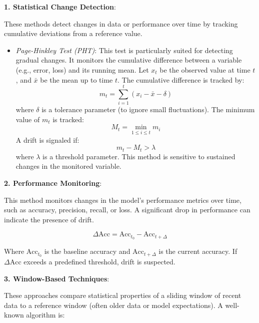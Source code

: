 \textbf{1. Statistical Change Detection}:

These methods detect changes in data or performance over time by tracking
cumulative deviations from a reference value.

\begin{itemize}
    \item \textit{Page-Hinkley Test (PHT)}: This test is particularly suited for
          detecting gradual changes. It monitors the cumulative difference between a variable
          (e.g., error, loss) and its running mean. Let $ x_t $ be the observed value at time
          $ t $, and $ \bar{x} $ be the mean up to time $ t $. The cumulative difference
          is tracked by:
          \begin{equation}
              m_t = \sum_{i=1}^{t} (x_i - \bar{x} - \delta)
          \end{equation}
          where $ \delta $ is a tolerance parameter (to ignore small fluctuations). The
          minimum value of $ m_t $ is tracked:
          \begin{equation}
              M_t = \min_{1 \leq i \leq t} m_i
          \end{equation}
          A drift is signaled if:
          \begin{equation}
              m_t - M_t > \lambda
          \end{equation}
          where $ \lambda $ is a threshold parameter. This method is sensitive to
          sustained changes in the monitored variable.
\end{itemize}

\textbf{2. Performance Monitoring}:

This method monitors changes in the model's performance metrics over time, such
as accuracy, precision, recall, or loss. A significant drop in performance can
indicate the presence of drift.

\begin{equation}
    \Delta \text{Acc} = \text{Acc}_{t_0} - \text{Acc}_{t+\Delta}
\end{equation}

Where $ \text{Acc}_{t_0} $ is the baseline accuracy and $ \text{Acc}_{t+\Delta}
$ is the current accuracy. If $ \Delta \text{Acc} $ exceeds a predefined
threshold, drift is suspected.

\textbf{3. Window-Based Techniques}:

These approaches compare statistical properties of a sliding window of recent
data to a reference window (often older data or model expectations). A
well-known algorithm is:

